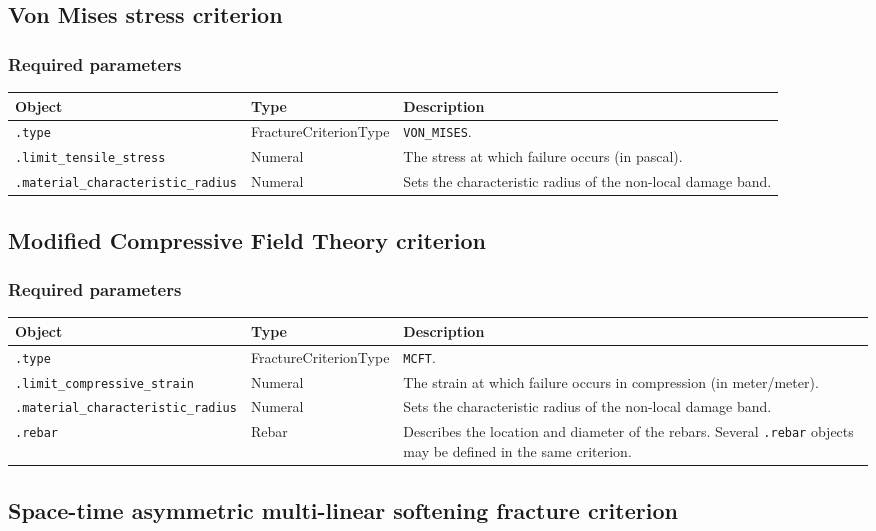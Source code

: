 \documentclass[10pt]{article}
\begin{document}
\subsection{Von Mises stress criterion}

\subsubsection*{Required parameters}

\begin{tabularx}{\textwidth}{llX}
\hline 
Object & Type & Description \\ 
\hline 
\verb+.type+ & FractureCriterionType & \verb+VON_MISES+. \\ 
\verb+.limit_tensile_stress+ & Numeral & The stress at which failure occurs (in pascal).\\
\verb+.material_characteristic_radius+ & Numeral & Sets the characteristic radius of the non-local damage band. \\ 
\hline 
\end{tabularx}

\subsection{Modified Compressive Field Theory criterion}

\subsubsection*{Required parameters}

\begin{tabularx}{\textwidth}{llX}
\hline 
Object & Type & Description \\ 
\hline 
\verb+.type+ & FractureCriterionType & \verb+MCFT+. \\ 
\verb+.limit_compressive_strain+ & Numeral & The strain at which failure occurs in compression (in meter/meter).\\
\verb+.material_characteristic_radius+ & Numeral & Sets the characteristic radius of the non-local damage band. \\ 
\verb+.rebar+ & Rebar & Describes the location and diameter of the rebars. Several \verb+.rebar+ objects may be defined in the same criterion.\\
\hline 
\end{tabularx}

\subsection{Space-time asymmetric multi-linear softening fracture criterion}
\end{document}
